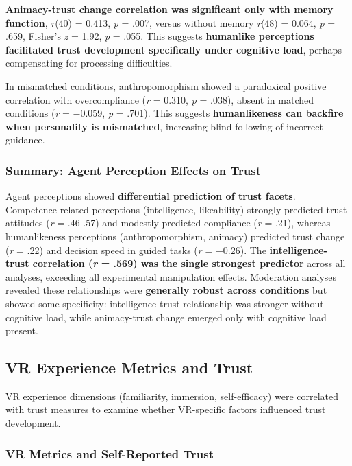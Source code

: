 \documentclass[12pt]{article}
\begin{document}
\textbf{Animacy-trust change correlation was significant only with memory function}, \textit{r}(40) = 0.413, \textit{p} = .007, versus without memory \textit{r}(48) = 0.064, \textit{p} = .659, Fisher's \textit{z} = 1.92, \textit{p} = .055. This suggests \textbf{humanlike perceptions facilitated trust development specifically under cognitive load}, perhaps compensating for processing difficulties.

In mismatched conditions, anthropomorphism showed a paradoxical positive correlation with overcompliance (\textit{r} = 0.310, \textit{p} = .038), absent in matched conditions (\textit{r} = $-$0.059, \textit{p} = .701). This suggests \textbf{humanlikeness can backfire when personality is mismatched}, increasing blind following of incorrect guidance.

\subsubsection{Summary: Agent Perception Effects on Trust}

Agent perceptions showed \textbf{differential prediction of trust facets}. Competence-related perceptions (intelligence, likeability) strongly predicted trust attitudes (\textit{r} = .46-.57) and modestly predicted compliance (\textit{r} = .21), whereas humanlikeness perceptions (anthropomorphism, animacy) predicted trust change (\textit{r} = .22) and decision speed in guided tasks (\textit{r} = $-$0.26). The \textbf{intelligence-trust correlation (\textit{r} = .569) was the single strongest predictor} across all analyses, exceeding all experimental manipulation effects. Moderation analyses revealed these relationships were \textbf{generally robust across conditions} but showed some specificity: intelligence-trust relationship was stronger without cognitive load, while animacy-trust change emerged only with cognitive load present.

\subsection{VR Experience Metrics and Trust}

VR experience dimensions (familiarity, immersion, self-efficacy) were correlated with trust measures to examine whether VR-specific factors influenced trust development.

\subsubsection{VR Metrics and Self-Reported Trust}
\end{document}
